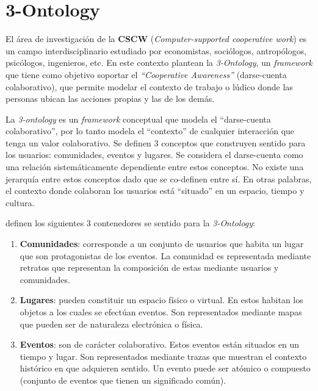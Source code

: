 \section{3-Ontology}
\label{marco:3ontology}

El área de investigación de la \textbf{CSCW} (\textit{Computer-supported cooperative work}) es un campo interdisciplinario estudiado por economistas, sociólogos, antropólogos, psicólogos, ingenieros, etc. En este contexto \cite{Leiva:2002} plantean la \textit{3-Ontology}, un \textit{framework} que tiene como objetivo soportar el \textit{“Cooperative Awareness”} (darse-cuenta colaborativo), que permite modelar el contexto de trabajo o lúdico donde las personas ubican las acciones propias y las de los demás.

La \textit{3-ontology} es un \textit{framework} conceptual que modela el ``darse-cuenta colaborativo'', por lo tanto modela el ``contexto'' de cualquier interacción que tenga un valor colaborativo. Se definen 3 conceptos que construyen sentido para los usuarios: comunidades, eventos y lugares. Se considera el  darse-cuenta como una relación sistemáticamente dependiente entre estos conceptos. No existe una jerarquía entre estos conceptos dado que se co-definen entre sí. En otras palabras, el contexto donde colaboran los usuarios está ``situado'' en un espacio, tiempo y cultura.

\cite{Leiva:2002} definen los siguientes 3 contenedores se sentido para la \textit{3-Ontology}:

\begin{enumerate}
	\item \textbf{Comunidades}: corresponde a un conjunto de usuarios que habita un lugar que son protagonistas de los eventos. La comunidad es representada mediante retratos que representan la composición de estas mediante usuarios y comunidades.
	\item  \textbf{Lugares}: pueden constituir un espacio físico o virtual. En estos habitan los objetos a los cuales se efectúan eventos. Son representados mediante mapas que pueden ser de naturaleza electrónica o física.
	\item \textbf{Eventos}: son de carácter colaborativo. Estos eventos están situados en un tiempo y lugar. Son representados mediante trazas que muestran el contexto histórico en que adquieren sentido. Un evento puede ser atómico o compuesto (conjunto de eventos que tienen un significado común).
\end{enumerate}

